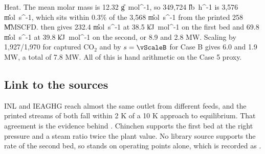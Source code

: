 Heat. The mean molar mass is 12.32 \U{g\ mol^{-1}}, so 349,724 \U{lb\ h^{-1}} is 3,576 \U{mol\ s^{-1}}, which sits within 0.3\% of the 3,568 \U{mol\ s^{-1}} from the printed 258 \U{MMSCFD}.  then gives 232.4 \U{mol\ s^{-1}} at 38.5 \U{kJ\ mol^{-1}} on the first bed and 69.8 \U{mol\ s^{-1}} at 39.8 \U{kJ\ mol^{-1}} on the second, or 8.9 and 2.8 MW. Scaling by 1,927/1,970 for captured CO$_2$ and by $s=\vScaleB$ for Case B gives 6.0 and 1.9 MW, a total of 7.8 MW. All of this is hand arithmetic on the Case 5 proxy.

\subsection*{Link to the sources}
INL and IEAGHG reach almost the same outlet from different feeds, and the printed streams of both fall within 2 K of a 10 K approach to equilibrium. That agreement is the evidence behind . Chinchen supports the first bed at the right pressure and a steam ratio twice the plant value. No library source supports the rate of the second bed, so  stands on operating points alone, which is recorded as .
